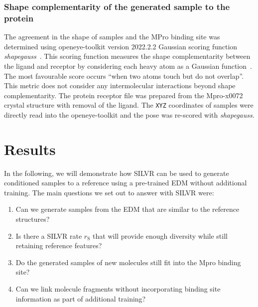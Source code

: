 \documentclass[journal=jacsat,manuscript=article]{achemso}
\begin{document}
\subsubsection{Shape complementarity of the generated sample to the protein}
The agreement in the shape of samples and the MPro binding site was determined using openeye-toolkit version 2022.2.2 Gaussian scoring function \textit{shapegauss}~\cite{openeyescientificsoftwareinc.oedocking,kelley2015posit}. This scoring function measures the shape complementarity between the ligand and receptor by considering each heavy atom as a Gaussian function~\cite{mcgann2003gaussian}. The most favourable score occurs “when two atoms touch but do not overlap”. This metric does not consider any intermolecular interactions beyond shape complementarity. The protein receptor file was prepared from the Mpro-x0072 crystal structure with removal of the ligand. The \texttt{XYZ} coordinates of samples were directly read into the openeye-toolkit and the pose was re-scored with \textit{shapegauss}. 


\section{Results}
In the following, we will demonstrate how SILVR can be used to generate conditioned samples to a reference using a pre-trained EDM without additional training. The main questions we set out to answer with SILVR were:
\begin{enumerate}
    \item Can we generate samples from the EDM that are similar to the reference structures?
    \item Is there a SILVR rate $r_{\mathrm{S}}$ that will provide enough diversity while still retaining reference features?
    \item Do the generated samples of new molecules still fit into the Mpro binding site?
    \item Can we link molecule fragments without incorporating binding site information as part of additional training?
\end{enumerate}
\end{document}
